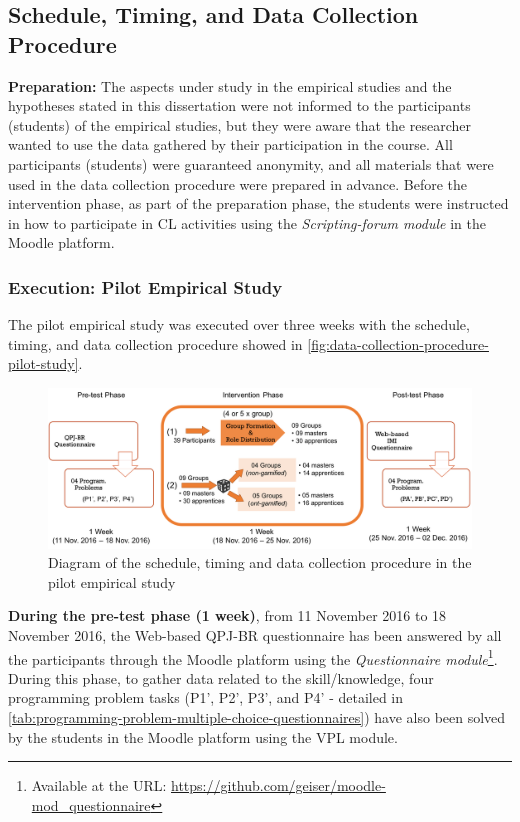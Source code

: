 \subsection{Schedule, Timing, and Data Collection Procedure}
\label{subsec:data-collection-procedure}

\textbf{Preparation:} The aspects under study in the empirical studies and the hypotheses stated in this dissertation were not informed to the participants (students) of the empirical studies, but they were aware that the researcher wanted to use the data gathered by their participation in the course.
All participants (students) were guaranteed anonymity, and all materials that were used in the data collection procedure were prepared in advance.
Before the intervention phase, as part of the preparation phase, the students were instructed in how to participate in CL activities using the \emph{Scripting-forum module} in the Moodle platform.

\subsubsection{Execution: Pilot Empirical Study}

The pilot empirical study was executed over three weeks with the schedule, timing, and data collection procedure showed in \autoref{fig:data-collection-procedure-pilot-study}.~

\begin{figure}[htb]
 \caption{Diagram of the schedule, timing and data collection procedure in the pilot empirical study}
 \label{fig:data-collection-procedure-pilot-study}
 \centering
 \includegraphics[width=1\textwidth]{images/chap-evaluation/data-collection-procedure-pilot-study.png}
 \fautor
\end{figure}

\textbf{During the pre-test phase (1 week)}, from 11 November 2016 to 18 November 2016, the Web-based QPJ-BR questionnaire has been answered by all the participants through the Moodle platform using the \emph{Questionnaire module}\footnote{Available at the URL: \url{https://github.com/geiser/moodle-mod\_questionnaire}}.
During this phase, to gather data related to the skill/knowledge, four programming problem tasks (P1', P2', P3', and P4' - detailed in \autoref{tab:programming-problem-multiple-choice-questionnaires}) have also been solved by the students in the Moodle platform using the VPL module.

